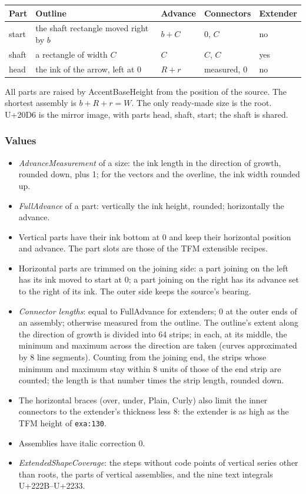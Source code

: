 \documentclass[10pt]{article}
\newcommand\U[1]{U+#1}
\newcommand\slot[2]{\texttt{#1:#2}}
\begin{document}
\begin{center}
\begin{tabular}{lllll}
\toprule
Part & Outline & Advance & Connectors & Extender \\
\midrule
start & the shaft rectangle moved right by $b$ & $b + C$ & 0, $C$ & no \\
shaft & a rectangle of width $C$ & $C$ & $C$, $C$ & yes \\
head & the ink of the arrow, left at 0 & $R + r$ & measured, 0 & no \\
\bottomrule
\end{tabular}
\end{center}

All parts are raised by AccentBaseHeight
from the position of the source.  The shortest assembly is
$b + R + r = W$.  The only ready-made size is the root.  \U{20D6} is the
mirror image, with parts head, shaft, start; the shaft is shared.

\subsubsection{Values}

\begin{itemize}
\item \emph{AdvanceMeasurement} of a size: the ink length in the
  direction of growth, rounded down, plus 1; for the vectors and the
  overline, the ink width rounded up.
\item \emph{FullAdvance} of a part: vertically the ink height,
  rounded; horizontally the advance.
\item Vertical parts have their ink bottom at 0 and keep their
  horizontal position and advance.  The part slots are those of the
  TFM extensible recipes.
\item Horizontal parts are trimmed on the joining side: a part joining
  on the left has its ink moved to start at 0; a part joining on the
  right has its advance set to the right of its ink.  The outer side
  keeps the source's bearing.
\item \emph{Connector lengths}: equal to FullAdvance for extenders; 0 at
  the outer ends of an assembly; otherwise measured from the outline.
  The outline's extent along the direction of growth is divided into
  64 strips; in each, at its middle, the minimum and maximum across
  the direction are taken (curves approximated by 8 line segments).
  Counting from the joining end, the strips whose minimum and maximum
  stay within 8 units of those of the end strip are counted; the
  length is that number times the strip length, rounded down.
\item The horizontal braces (over, under, Plain, Curly) also limit the
  inner connectors to the extender's thickness less 8: the extender is
  as high as the TFM height of \slot{exa}{130}.
\item Assemblies have italic correction 0.
\item \emph{ExtendedShapeCoverage}: the steps without code points of
  vertical series other than roots, the parts of vertical assemblies,
  and the nine text integrals \U{222B}--\U{2233}.
\end{itemize}
\end{document}
